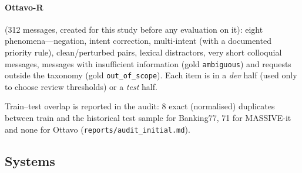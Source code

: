 \paragraph{Ottavo-R} (312 messages, created for this study before any evaluation on it): eight phenomena---negation, intent correction,
multi-intent (with a documented priority rule), clean/perturbed pairs, lexical distractors, very short colloquial messages, messages
with insufficient information (gold \texttt{ambiguous}) and requests outside the taxonomy (gold \texttt{out\_of\_scope}). Each item
is in a \emph{dev} half (used only to choose review thresholds) or a \emph{test} half.

Train--test overlap is reported in the audit: 8 exact (normalised) duplicates between train and the historical test sample for
Banking77, 71 for MASSIVE-it and none for Ottavo (\nolinkurl{reports/audit_initial.md}).

\subsection{Systems}

\begin{table}[t]
\centering\small
\caption{Systems. ``Task labels'' counts labelled examples of the target task used by the system. $^*$With label names (N); the
descriptions (D) for Banking77 and MASSIVE-it were written from labelled training examples (Section~\ref{sec:data}).}
\label{tab:systems}
\end{table}

